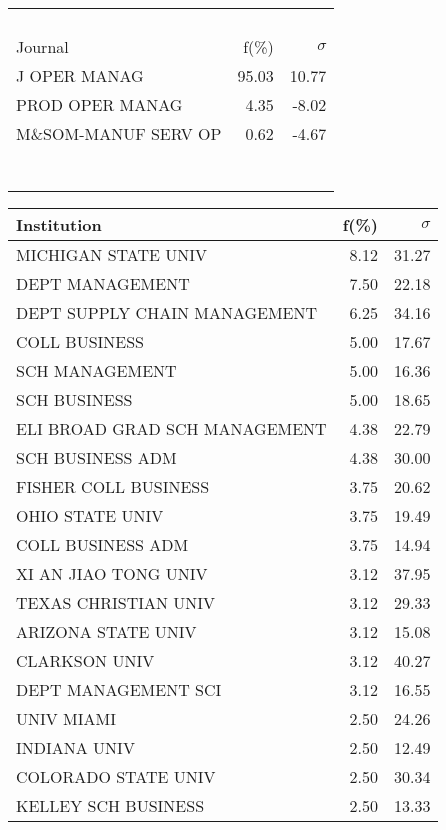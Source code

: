 \documentclass[a4paper,11pt]{report}
\begin{document}
\begin{landscape}
\begin{table}[!ht]
{\begin{tabular}{|l r  r|}
 &  & \\
 &  & \\
 &  & \\
 &  & \\
\hline
\hline
Journal & f(\%) & $\sigma$\\
\hline
J OPER MANAG & 95.03 & 10.77\\
PROD OPER MANAG & 4.35 & -8.02\\
M\&SOM-MANUF SERV OP & 0.62 & -4.67\\
 &  & \\
 &  & \\
 &  & \\
 &  & \\
 &  & \\
 &  & \\
 &  & \\
\hline
\end{tabular}
}
{\scriptsize\begin{tabular}{|l r r|}
\hline
Institution & f(\%) & $\sigma$\\
\hline
MICHIGAN STATE UNIV & 8.12 & 31.27\\
DEPT MANAGEMENT & 7.50 & 22.18\\
DEPT SUPPLY CHAIN MANAGEMENT & 6.25 & 34.16\\
COLL BUSINESS & 5.00 & 17.67\\
SCH MANAGEMENT & 5.00 & 16.36\\
SCH BUSINESS & 5.00 & 18.65\\
ELI BROAD GRAD SCH MANAGEMENT & 4.38 & 22.79\\
SCH BUSINESS ADM & 4.38 & 30.00\\
FISHER COLL BUSINESS & 3.75 & 20.62\\
OHIO STATE UNIV & 3.75 & 19.49\\
COLL BUSINESS ADM & 3.75 & 14.94\\
XI AN JIAO TONG UNIV & 3.12 & 37.95\\
TEXAS CHRISTIAN UNIV & 3.12 & 29.33\\
ARIZONA STATE UNIV & 3.12 & 15.08\\
CLARKSON UNIV & 3.12 & 40.27\\
DEPT MANAGEMENT SCI & 3.12 & 16.55\\
UNIV MIAMI & 2.50 & 24.26\\
INDIANA UNIV & 2.50 & 12.49\\
COLORADO STATE UNIV & 2.50 & 30.34\\
KELLEY SCH BUSINESS & 2.50 & 13.33\\
\hline
\hline

\end{tabular}}
\end{table}
\end{landscape}
\end{document}
